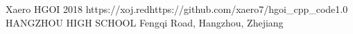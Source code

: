 \documentclass{xaerobook}
\begin{document}
       {Xaero}
       {HGOI}
       {2018}
       {https://xoj.red}{https://github.com/xaero7/hgoi_cpp_code}{1.0}
       {HANGZHOU HIGH SCHOOL}
       { Fengqi Road, Hangzhou, Zhejiang}











\end{document}
